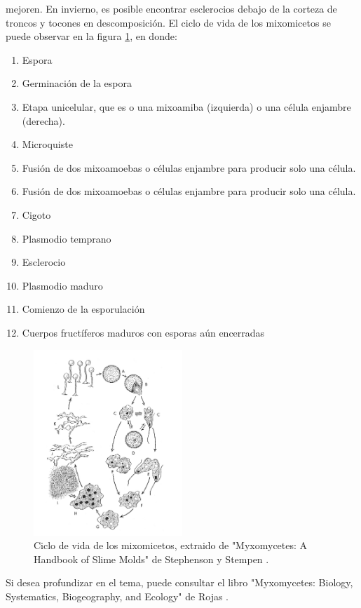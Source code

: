         mejoren. En invierno, es posible encontrar esclerocios debajo de la corteza de troncos y tocones en descomposici\'on.
    \vskip 0.5cm
    El ciclo de vida de los mixomicetos se puede observar en la figura \ref{fig:MixomicetoCicloVida}, en donde: 
    \renewcommand{\labelenumi}{{\Alph{enumi}})} 
    \begin{enumerate}
        \item Espora 
        \item Germinaci\'on de la espora
        \item Etapa unicelular, que es o una mixoamiba (izquierda) o una c\'elula enjambre (derecha).
        \item Microquiste
        \item Fusi\'on de dos mixoamoebas o c\'elulas enjambre para producir solo una c\'elula.
        \item Fusi\'on de dos mixoamoebas o c\'elulas enjambre para producir solo una c\'elula.
        \item Cigoto
        \item Plasmodio temprano
        \item Esclerocio 
        \item Plasmodio maduro
        \item Comienzo de la esporulaci\'on 
        \item Cuerpos fruct\'iferos maduros con esporas a\'un encerradas
    \end{enumerate}
    \begin{figure}[h]
        \centering
        \includegraphics[width=0.5\textwidth]{./images/marco_teorico/Physarum/mixomiceto_ciclo_vida.png}
        \caption{Ciclo de vida de los mixomicetos, extraido de "Myxomycetes: A Handbook of Slime Molds" de Stephenson y Stempen \cite{Stephenson1994}.}
        \label{fig:MixomicetoCicloVida}
    \end{figure}
    \vskip 0.5cm
    Si desea profundizar en el tema, puede consultar el libro "Myxomycetes: Biology, Systematics, Biogeography, and Ecology" de Rojas \cite{Rojas2017}.
    \vskip 0.5cm
    \clearpage